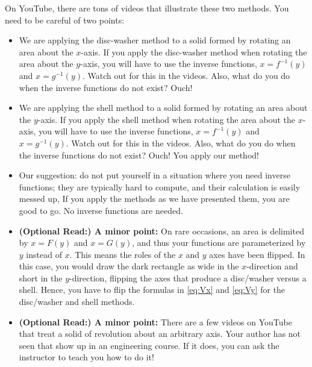 \begin{rem}

On YouTube, there are tons of videos that illustrate these two methods. You need to be careful of two points:
\begin{itemize}
    \item We are applying the disc-washer method to a solid formed by rotating an area about the $x$-axis. If you apply the disc-washer method when rotating the area about the $y$-axis, you will have to use the inverse functions, $x=f^{-1}(y)$ and $x=g^{-1}(y)$. Watch out for this in the videos. Also, what do you do when the inverse functions do not exist? Ouch!
       \item We are applying the shell method to a solid formed by rotating an area about the $y$-axis. If you apply the shell method when rotating the area about the $x$-axis, you will have to use the inverse functions, $x=f^{-1}(y)$ and $x=g^{-1}(y)$. Watch out for this in the videos. Also, what do you do when the inverse functions do not exist? Ouch! You apply our method! 
       \item Our suggestion: do not put yourself in a situation where you need inverse functions; they are typically hard to compute, and their calculation is easily messed up, If you apply the methods as we have presented them, you are good to go. No inverse functions are needed.
       \item \textbf{(Optional Read:) A minor point:} On rare occasions, an area is delimited by $x = F(y)$ and $x = G(y)$, and thus your functions are parameterized by $y$ instead of $x$. This means the roles of the $x$ and $y$ axes have been flipped. In this case, you would draw the dark rectangle as wide in the $x$-direction and short in the $y$-direction, flipping the axes that produce a disc/washer versus a shell. Hence, you have to flip the formulas in \eqref{eq:Vx} and \eqref{eq:Vy} for the disc/washer and shell methods. 
        \item \textbf{(Optional Read:) A minor point:} There are a few videos on YouTube that treat a solid of revolution about an arbitrary axis. Your author has not seen that show up in an engineering course. If it does, you can ask the instructor to teach you how to do it!
\end{itemize}
    
\end{rem}

\bigskip

